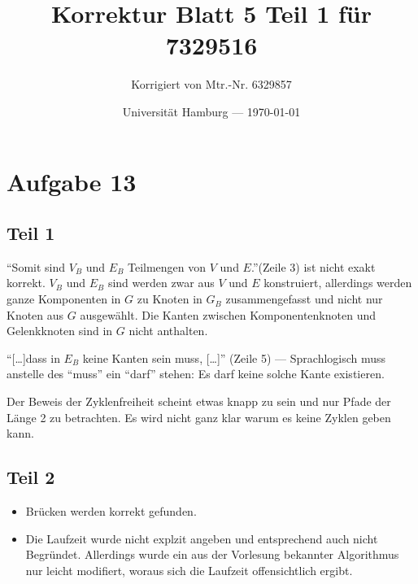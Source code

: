 \documentclass[parskip=half,a4paper]{scrartcl}
\title{Korrektur Blatt 5 Teil 1 für 7329516}
\author{Korrigiert von Mtr.-Nr. 6329857}
\date{Universität Hamburg --- \today}
\begin{document}
\maketitle %

\section{Aufgabe 13}

\subsection{Teil 1}

\enquote{Somit sind $V_B$ und $E_B$ Teilmengen von $V$ und $E$.}(Zeile 3) ist nicht exakt korrekt. $V_B$ und $E_B$ sind werden zwar aus $V$ und $E$ konstruiert, allerdings werden ganze Komponenten in $G$ zu Knoten in $G_B$ zusammengefasst und nicht nur Knoten aus $G$ ausgewählt. Die Kanten zwischen Komponentenknoten und Gelenkknoten sind in $G$ nicht anthalten.

\enquote{[\dots]dass in $E_B$ keine Kanten sein muss, [\dots]} (Zeile 5) --- Sprachlogisch muss anstelle des \enquote{muss} ein \enquote{darf} stehen: Es darf keine solche Kante existieren.

Der Beweis der Zyklenfreiheit scheint etwas knapp zu sein und nur Pfade der Länge 2 zu betrachten. Es wird nicht ganz klar warum es keine Zyklen geben kann.

\subsection{Teil 2}

\begin{itemize}
    \item Brücken werden korrekt gefunden.
    \item Die Laufzeit wurde nicht explzit angeben und entsprechend auch nicht Begründet. Allerdings wurde ein aus der Vorlesung bekannter Algorithmus nur leicht modifiert, woraus sich die Laufzeit offensichtlich ergibt.
\end{itemize}
\end{document}
